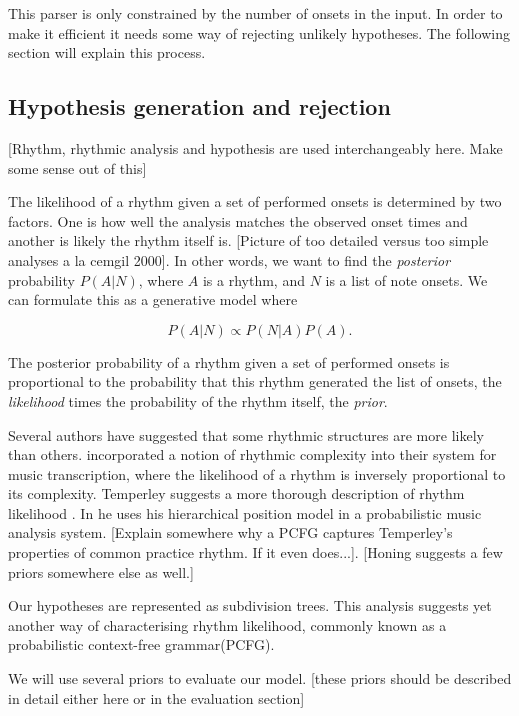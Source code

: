 This parser is only constrained by the number of onsets in the input. In order to make it efficient it needs some way of rejecting unlikely hypotheses. The following section will explain this process.


\subsection{Hypothesis generation and rejection}
\label{sec:rejection}

[Rhythm, rhythmic analysis and hypothesis are used interchangeably here. Make some sense out of this]

The likelihood of a rhythm given a set of performed onsets is determined by two factors. One is how well the analysis matches the observed onset times and another is likely the rhythm itself is. [Picture of too detailed versus too simple analyses a la cemgil 2000]. In other words, we want to find the \textit{posterior} probability $P(A|N)$, where $A$ is a rhythm, and $N$ is a list of note onsets. We can formulate this as a generative model where

\begin{equation}
\label{eq:model}
P(A|N) \propto P(N|A)P(A).
\end{equation}

The posterior probability of a rhythm given a set of performed onsets is proportional to the probability that this rhythm generated the list of onsets, the \textit{likelihood} times the probability of the rhythm itself, the \textit{prior}.

Several authors have suggested that some rhythmic structures are more likely than others. \cite{cemgil2000rhythm} incorporated a notion of rhythmic complexity into their system for music transcription, where the likelihood of a rhythm is inversely proportional to its complexity. Temperley suggests a more thorough description of rhythm likelihood \citep{temperley2010modeling}. In \cite{temperley2009unified} he uses his hierarchical position model in a probabilistic music analysis system. [Explain somewhere why a PCFG captures Temperley's properties of common practice rhythm. If it even does...]. [Honing suggests a few priors somewhere else as well.]

Our hypotheses are represented as subdivision trees. This analysis suggests yet another way of characterising rhythm likelihood, commonly known as a probabilistic context-free grammar(PCFG). 

We will use several priors to evaluate our model. [these priors should be described in detail either here or in the evaluation section]

